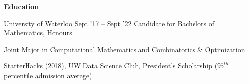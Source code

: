 \documentclass{resume} %
\begin{document}

\begin{rSection}{\textbf{Education}}
  \begin{rSubsection}{University of Waterloo}
		     {Sept '17 -- Sept '22}
		     {Candidate for Bachelors of Mathematics, Honours}
		     {}
		\item Joint Major in Computational Mathematics and Combinatorics \& Optimization     
		\item StarterHacks (2018), UW Data Science Club, President's Scholarship ($95^{th}$ percentile admission average)
  \end{rSubsection}
\end{rSection} 
\end{document}
